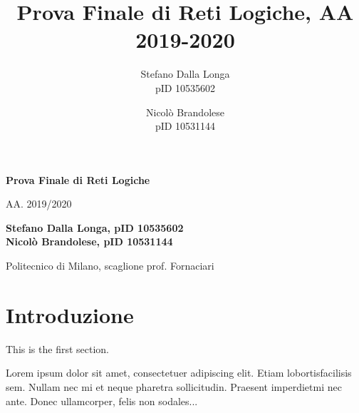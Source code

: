 \documentclass[12pt,a4paper,titlepage]{article}
\author{Stefano Dalla Longa\\pID 10535602 \and Nicolò Brandolese\\pID 10531144}
\date{}
\title{Prova Finale di Reti Logiche, AA 2019-2020}
\begin{document}
	\begin{titlepage}
    \begin{center}
        \vspace*{3cm}
            
        \Huge
        \textbf{Prova Finale di Reti Logiche}
            
        \vspace{0.5cm}
        \LARGE
        AA. 2019/2020
            
        \vspace{1.5cm}
            
        \textbf{Stefano Dalla Longa, pID 10535602 \\ Nicolò Brandolese, pID 10531144}
        
        \vspace{1.2 cm}
        \Large
		Politecnico di Milano, scaglione prof. Fornaciari
            
        \vspace{0.8cm}
            
    \end{center}
\end{titlepage}

	\tableofcontents
	\clearpage	%
	\section{Introduzione}
   
		This is the first section.
      
		Lorem  ipsum  dolor  sit  amet,  consectetuer  adipiscing  
		elit.   Etiam  lobortisfacilisis sem.  Nullam nec mi et 
		neque pharetra sollicitudin.  Praesent imperdietmi nec ante. 
		Donec ullamcorper, felis non sodales...
       
\end{document}
